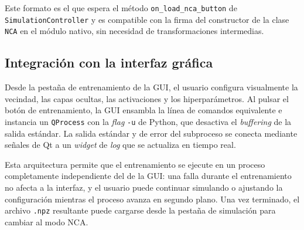 \begin{sloppypar}
Este formato es el que espera el método \texttt{on\_load\_nca\_button} de \texttt{SimulationController} y es compatible con la firma del constructor de la clase \texttt{NCA} en el módulo nativo, sin necesidad de transformaciones intermedias.
\end{sloppypar}

\subsection{Integración con la interfaz gráfica}

Desde la pestaña de entrenamiento de la GUI, el usuario configura visualmente la vecindad, las capas ocultas, las activaciones y los hiperparámetros. Al pulsar el botón de entrenamiento, la GUI ensambla la línea de comandos equivalente e instancia un \texttt{QProcess} con la \textit{flag} \texttt{-u} de Python, que desactiva el \textit{buffering} de la salida estándar. La salida estándar y de error del subproceso se conecta mediante señales de Qt a un \textit{widget} de \textit{log} que se actualiza en tiempo real.

Esta arquitectura permite que el entrenamiento se ejecute en un proceso completamente independiente del de la GUI: una falla durante el entrenamiento no afecta a la interfaz, y el usuario puede continuar simulando o ajustando la configuración mientras el proceso avanza en segundo plano. Una vez terminado, el archivo \texttt{.npz} resultante puede cargarse desde la pestaña de simulación para cambiar al modo NCA.
